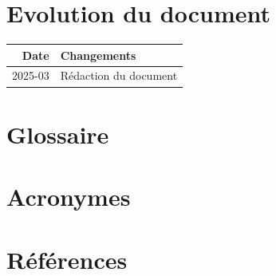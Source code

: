 \documentclass[a4paper,12pt]{article}
\begin{document}
\section*{Evolution du document}
\label{sec:org9837f43}
\begin{center}
\begin{tabular}{rl}
Date & Changements\\
\hline
2025-03 & Rédaction du document\\
\end{tabular}
\end{center}
\section*{Glossaire}
\label{sec:orgb34ef3c}
\section*{Acronymes}
\label{sec:org99b465d}
\section*{Références}
\label{sec:org39bbb97}
\printbibliography[heading=none]
\end{document}
